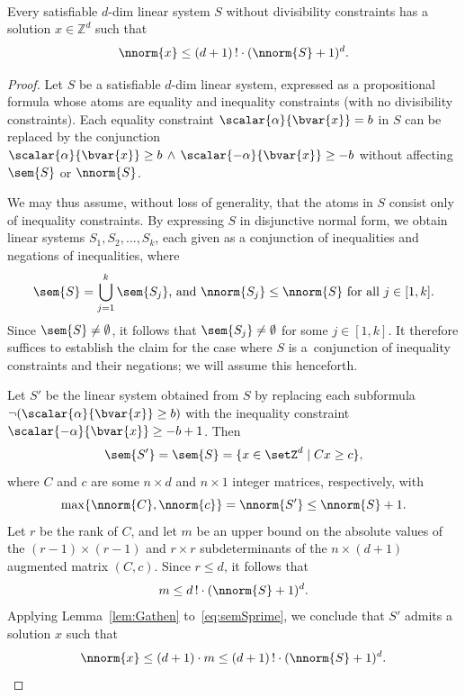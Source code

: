 \begin{lem}
\label{lem:nodivsmallsolutions}
\hfill\\
Every satisfiable $d$-dim linear system $S$ without divisibility constraints has a solution $x \in \mathbb{Z}^d$ such that 
\[
    \nnorm{x} \leq (d+1)\,!\cdot(\nnorm{S}+1)^d.
\]
\end{lem}
\begin{proof}
Let $S$ be a satisfiable $d$-dim linear system, expressed as a
	propositional formula whose atoms are equality and inequality
	constraints (with no divisibility constraints).
Each equality constraint
	$\scalar{\alpha}{\bvar{x}}=b$ in $S$ can be replaced by the
	conjunction
	$\scalar{\alpha}{\bvar{x}}\geq b\,\wedge\,
	\scalar{-\alpha}{\bvar{x}}\geq -b$ without affecting
	$\sem{S}$ or $\nnorm{S}$. 

	We may thus assume,
	without loss of generality, that the atoms in $S$ consist only
	of inequality constraints.
By
expressing $S$ in disjunctive normal form, we obtain
	linear systems $S_1,S_2,\ldots,S_k$, each given as a
	conjunction of inequalities and negations of
	inequalities, where
	\[\sem{S}=\bigcup_{j=1}^k\sem{S_j}\text{, and }
	\nnorm{S_j}\leq \nnorm{S}\text{ for all }j\in[1,k].\]
Since $\sem{S}\neq\emptyset$, it follows that $\sem{S_j}\neq\emptyset$ for some $j\in[1,k]$.
It therefore suffices to establish the claim for the case where  
$S$ is a~conjunction of inequality constraints and their negations; we
	will assume this henceforth.

Let $S'$ be the linear system obtained from $S$ by replacing
	each subformula $\neg(\scalar{\alpha}{\bvar{x}}\geq b)$ with
	the
	inequality constraint $\scalar{-\alpha}{\bvar{x}}\geq -b+1$.
Then
	\begin{equation}\label{eq:semSprime}\sem{S'}=\sem{S}=\{x\in\setZ^d\mid
	Cx\geq c\},\end{equation}
where $C$ and $c$ are some $n\times d$ and $n\times 1$ integer
	matrices, respectively, with
	\[
		\max\{\nnorm{C},\nnorm{c}\}=\nnorm{S'}\leq\nnorm{S}+1.\]
        Let $r$ be the rank of $C$, and let $m$ be an upper bound on
	the absolute values of the $(r-1)\times (r-1)$ and $r\times r$
	subdeterminants of the $n\times (d+1)$ augmented matrix $(C, c)$.
Since  $r\leq d$, it follows that
	\[m\leq d\,!\cdot (\nnorm{S}+1)^d.\]
	Applying Lemma~\ref{lem:Gathen} to~\eqref{eq:semSprime}, we
conclude that $S'$ admits a solution $x$ such that 
	\[\nnorm{x}\leq (d+1)\cdot m\leq (d+1)\,!\cdot
	(\nnorm{S}+1)^d.\qedhere\]
\end{proof}


